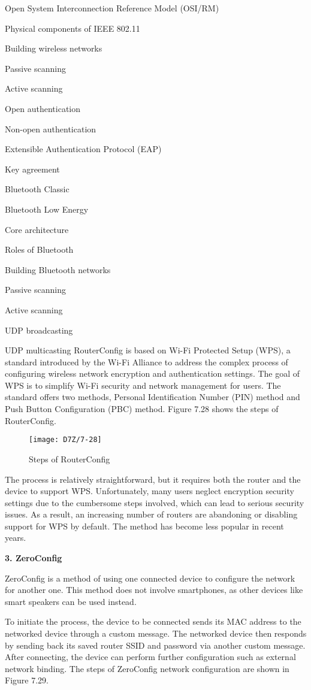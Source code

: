 \documentclass[a4paper,12pt]{book}
\begin{document}
\begin{term}{Open System Interconnection Reference Model (OSI/RM)}
\begin{term}{Physical components of IEEE 802.11}
\begin{term}{Building wireless networks}
\begin{term}{Passive scanning}
\begin{term}{Active scanning}
\begin{term}{Open authentication}
\begin{term}{Non-open authentication}
\begin{term}{Extensible Authentication Protocol (EAP)}
\begin{term}{Key agreement}
\begin{term}{Bluetooth Classic}
\begin{term}{Bluetooth Low Energy}
\begin{term}{Core architecture}
\begin{term}{Roles of Bluetooth}
\begin{term}{Building Bluetooth networks}
\begin{term}{Passive scanning}
\begin{term}{Active scanning}
\begin{term}{UDP broadcasting}
\begin{term}{UDP multicasting}
RouterConfig is based on Wi-Fi Protected Setup (WPS), a standard introduced by the Wi-Fi Alliance to address the complex process of configuring wireless network encryption and authentication settings. The goal of WPS is to simplify Wi-Fi security and network management for users. The standard offers two methods, Personal Identification Number (PIN) method and Push Button Configuration (PBC) method. Figure 7.28 shows the steps of RouterConfig.

\begin{figure}[!h]
    \centering
    \texttt{[image: D7Z/7-28]}
    \caption{Steps of RouterConfig}
\end{figure}

The process is relatively straightforward, but it requires both the router and the device to support WPS. Unfortunately, many users neglect encryption security settings due to the cumbersome steps involved, which can lead to serious security issues. As a result, an increasing number of routers are abandoning or disabling support for WPS by default. The method has become less popular in recent years.


\textbf{3. ZeroConfig}

ZeroConfig is a method of using one connected device to configure the network for another one. This method does not involve smartphones, as other devices like smart speakers can be used instead.

To initiate the process, the device to be connected sends its MAC address to the networked device through a custom message. The networked device then responds by sending back its saved router SSID and password via another custom message. After connecting, the device can perform further configuration such as external network binding. The steps of ZeroConfig network configuration are shown in Figure 7.29.


\end{term}
\end{term}
\end{term}
\end{term}
\end{term}
\end{term}
\end{term}
\end{term}
\end{term}
\end{term}
\end{term}
\end{term}
\end{term}
\end{term}
\end{term}
\end{term}
\end{term}
\end{term}
\end{document}
